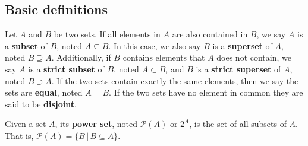 \documentclass{bareminimum}
\begin{document}
\subsection{Basic definitions}


\begin{defn}
	Let $A$ and $B$ be two sets.  If all elements in $A$ are also contained in $B$, we say $A$ is a \textbf{subset} of $B$, noted $A \subseteq B$. In this case, we also say $B$ is a \textbf{superset} of $A$, noted $B \supseteq A$. Additionally, if $B$ contains elements that $A$ does not contain, we say $A$ is a \textbf{strict subset} of $B$, noted $A \subset B$, and $B$ is a \textbf{strict superset} of $A$, noted $B \supset A$. If the two sets contain exactly the same elements, then we say the sets are \textbf{equal}, noted $A = B$. If the two sets have no element in common they are said to be \textbf{disjoint}.
\end{defn}

\begin{defn}
	Given a set $A$, its \textbf{power set},  noted $\mathcal{P}(A)$ or $2^{A}$, is the set of all subsets of $A$. That is, $\mathcal{P}(A) = \{B \, | \, B \subseteq A \}$.
\end{defn}
\end{document}

